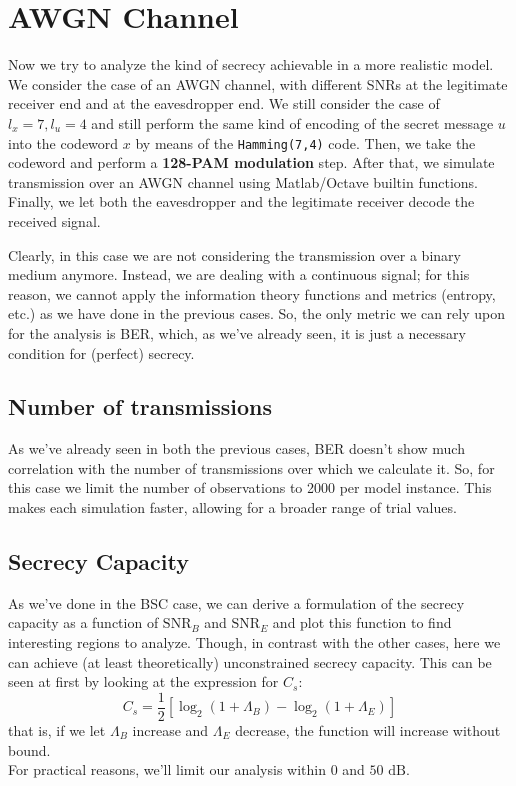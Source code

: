 \documentclass[a4paper,12pt,titlepage]{article}
\begin{document}
\section{AWGN Channel}

Now we try to analyze the kind of secrecy achievable in a more realistic model.
We consider the case of an AWGN channel, with different SNRs at the legitimate
receiver end and at the eavesdropper end. We still consider the case of $l_x =
7, l_u = 4$ and still perform the same kind of encoding of the secret message
$u$ into the codeword $x$ by means of the \texttt{Hamming(7,4)} code. Then, we
take the codeword and perform a \textbf{128-PAM modulation} step. After that,
we simulate transmission over an AWGN channel using Matlab/Octave builtin
functions. Finally, we let both the eavesdropper and the legitimate receiver
decode the received signal.

Clearly, in this case we are not considering the transmission over a binary
medium anymore. Instead, we are dealing with a continuous signal; for this reason, we
cannot apply the information theory functions and metrics (entropy, etc.) as we
have done in the previous cases. So, the only metric we can rely upon for the
analysis is BER, which, as we've already seen, it is just a necessary condition
for (perfect) secrecy.

\subsection*{Number of transmissions}
As we've already seen in both the previous cases, BER doesn't show much
correlation with the number of transmissions over which we calculate it. So,
for this case we limit the number of observations to 2000 per model instance.
This makes each simulation faster, allowing for a broader range of trial
values.

\subsection*{Secrecy Capacity}
As we've done in the BSC case, we can derive a formulation of the secrecy
capacity as a function of $\text{SNR}_B$ and $\text{SNR}_E$ and plot this
function to find interesting regions to analyze. Though, in contrast with the
other cases, here we can achieve (at least theoretically) unconstrained secrecy
capacity. This can be seen at first by looking at the expression for $C_s$:
\[
  C_s = \frac{1}{2} [ \log_2(1+\Lambda_B) - \log_2(1+\Lambda_E) ]
\]
that is, if we let $\Lambda_B$ increase and $\Lambda_E$ decrease, the function
will increase without bound. \\
For practical reasons, we'll limit our analysis within $0$ and $50 \text{ dB}$.
\end{document}
